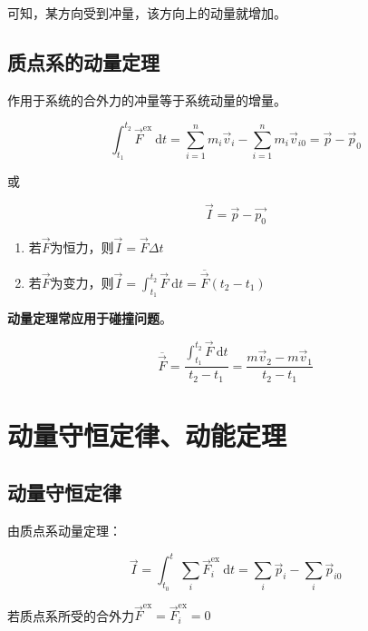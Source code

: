 \documentclass[12pt, a4paper]{article}
\numberwithin{equation}{section}
\newcommand{\rmd}{\mathrm{~d}}
\begin{document}
    可知，某方向受到冲量，该方向上的动量就增加。

\subsection{质点系的动量定理}

    作用于系统的合外力的冲量等于系统动量的增量。

    \begin{equation}
        \int_{t_1}^{t_2} \overrightarrow{F}^{\mathrm{ex}} \mathrm{~d} t=
        \sum_{i=1}^n m_i \overrightarrow{v}_i-\sum_{i=1}^n m_i \overrightarrow{v}_{i 0}
        =\overrightarrow{p}-\overrightarrow{p}_0
    \end{equation}

    或

    \[
        \overrightarrow{I} = \overrightarrow{p} - \overrightarrow{p_{0}}
    \]

    \begin{enumerate}
        \item 若\(\overrightarrow{F}\)为恒力，则\(\overrightarrow{I} = \overrightarrow{F} \Delta t\)
        \item 若\(\overrightarrow{F}\)为变力，则\(\overrightarrow{I} =
            \int_{t_1}^{t_2} \overrightarrow{F} \rmd t = \overline{\overrightarrow{F}}\left(t_2-t_1\right)\)
    \end{enumerate}

    \textbf{动量定理常应用于碰撞问题}。

    $$
    \overline{\overrightarrow{F}}=\frac{\int_{t_1}^{t_2} \overrightarrow{F} \mathrm{~d} t}{t_2-t_1}
    =\frac{m \overrightarrow{v}_2-m \overrightarrow{v}_1}{t_2-t_1}
    $$

\section{动量守恒定律、动能定理}

\subsection{动量守恒定律}

    由质点系动量定理：

    $$
        \overrightarrow{I}=\int_{t_0}^t \sum_i \overrightarrow{F}_i^{\mathrm{ex}} \mathrm{~d} t=
        \sum_i \overrightarrow{p}_i-\sum_i \overrightarrow{p}_{i 0}
    $$

    若质点系所受的合外力\(\overrightarrow{F}^{\mathrm{ex}} = \overrightarrow{F}_i^{\mathrm{ex}}= 0\)
\end{document}

